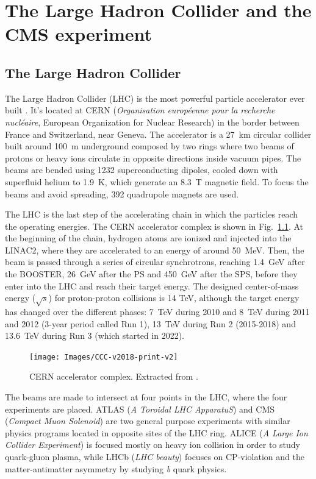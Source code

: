 \documentclass[../main.tex]{subfiles}
\begin{document}
\chapter{The Large Hadron Collider and the CMS experiment}

\section{The Large Hadron Collider}

The Large Hadron Collider (LHC) is the most powerful particle accelerator ever built \cite{intro:exp:lhc}. It's located at CERN (\textit{Organisation européenne pour la recherche nucléaire}, European Organization for Nuclear Research) in the border between France and Switzerland, near Geneva. The accelerator is a 27~km circular collider built around 100~m underground composed by two rings where two beams of protons or heavy ions circulate in opposite directions inside vacuum pipes. The beams are bended using 1232 superconducting dipoles, cooled down with superfluid helium to 1.9~K, which generate an 8.3~T magnetic field. To focus the beams and avoid spreading, 392 quadrupole magnets are used.

The LHC is the last step of the accelerating chain in which the particles reach the operating energies. The CERN accelerator complex is shown in Fig.~\ref{intro:exp:cern_acc_chain}. At the beginning of the chain, hydrogen atoms are ionized and injected into the LINAC2, where they are accelerated to an energy of around 50~MeV. Then, the beam is passed through a series of circular synchrotrons, reaching 1.4~GeV after the BOOSTER, 26~GeV after the PS and 450~GeV after the SPS, before they enter into the LHC and reach their target energy. The designed center-of-mass energy ($\sqrt{s}$) for proton-proton collisions is 14 TeV, although the target energy has changed over the different phases: 7~TeV during 2010 and 8~TeV during 2011 and 2012 (3-year period called Run 1), 13~TeV during Run 2 (2015-2018) and 13.6~TeV during Run 3 (which started in 2022).

\begin{figure}[h!]
\begin{center}
\texttt{[image: Images/CCC-v2018-print-v2]}
\end{center}
\caption{CERN accelerator complex. Extracted from \cite{intro:exp:cern_acc_chain_image}.}
\label{intro:exp:cern_acc_chain}
\end{figure}

The beams are made to intersect at four points in the LHC, where the four experiments are placed. ATLAS (\textit{A Toroidal LHC ApparatuS}) and CMS (\textit{Compact Muon Solenoid}) are two general purpose experiments with similar physics programs located in opposite sites of the LHC ring. ALICE (\textit{A Large Ion Collider Experiment}) is focused mostly on heavy ion collision in order to study quark-gluon plasma, while LHCb (\textit{LHC beauty}) focuses on CP-violation and the matter-antimatter asymmetry by studying \textit{b} quark physics.
\end{document}
